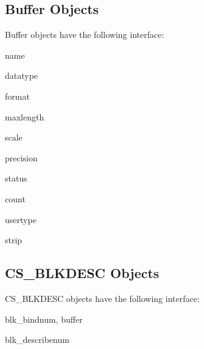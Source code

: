 \subsection{Buffer Objects}

Buffer objects have the following interface:

\begin{memberdesc}[Buffer]{name}
\end{memberdesc}

\begin{memberdesc}[Buffer]{datatype}
\end{memberdesc}

\begin{memberdesc}[Buffer]{format}
\end{memberdesc}

\begin{memberdesc}[Buffer]{maxlength}
\end{memberdesc}

\begin{memberdesc}[Buffer]{scale}
\end{memberdesc}

\begin{memberdesc}[Buffer]{precision}
\end{memberdesc}

\begin{memberdesc}[Buffer]{status}
\end{memberdesc}

\begin{memberdesc}[Buffer]{count}
\end{memberdesc}

\begin{memberdesc}[Buffer]{usertype}
\end{memberdesc}

\begin{memberdesc}[Buffer]{strip}
\end{memberdesc}

\subsection{CS_BLKDESC Objects}

CS_BLKDESC objects have the following interface:

\begin{methoddesc}[CS_BLKDESC]{blk_bind}{num, buffer}
\end{methoddesc}

\begin{methoddesc}[CS_BLKDESC]{blk_describe}{num}
\end{methoddesc}

